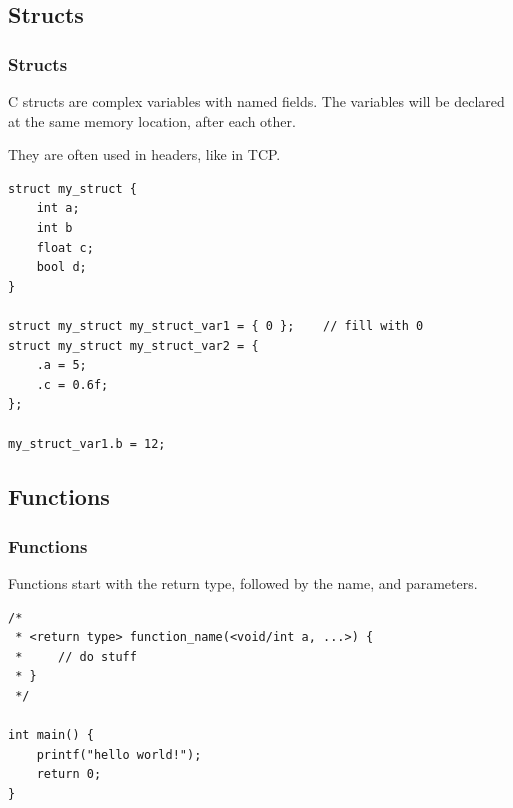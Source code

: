 \documentclass[
	11pt, %
]{beamer}
\begin{document}
\begin{frame}[fragile]
    \subsection{Structs}
	\frametitle{Structs}

    C structs are complex variables with named fields.
    The variables will be declared at the same memory location, after each other.

    They are often used in headers, like in TCP.

    \bigskip

    \begin{lstlisting}[style=CStyle]
struct my_struct {
    int a;
    int b
    float c;
    bool d;
}

struct my_struct my_struct_var1 = { 0 };    // fill with 0
struct my_struct my_struct_var2 = {
    .a = 5;
    .c = 0.6f;
};

my_struct_var1.b = 12;

\end{lstlisting}

\end{frame}

\begin{frame}[fragile]
    \subsection{Functions}
	\frametitle{Functions}

    Functions start with the return type, followed by the name, and parameters.

    \bigskip

    \begin{lstlisting}[style=CStyle]
/*
 * <return type> function_name(<void/int a, ...>) {
 *     // do stuff
 * }
 */

int main() {
    printf("hello world!");
    return 0;
}

\end{lstlisting}

\end{frame}
\end{document}

